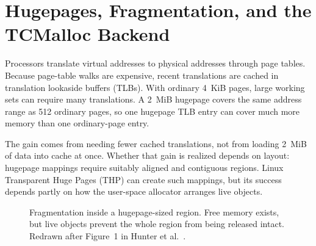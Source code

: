 \documentclass[sigconf]{acmart}
\begin{document}
\section{Hugepages, Fragmentation, and the TCMalloc Backend}
\label{sec:background-temeraire}

Processors translate virtual addresses to physical addresses through page
tables. Because page-table walks are expensive, recent translations are cached
in translation lookaside buffers (TLBs). With ordinary 4~KiB pages, large
working sets can require many translations. A 2~MiB hugepage covers the same
address range as 512 ordinary pages, so one hugepage TLB entry can cover much
more memory than one ordinary-page entry.

The gain comes from needing fewer cached translations, not from loading 2~MiB of
data into cache at once. Whether that gain is realized depends on layout:
hugepage mappings require suitably aligned and contiguous regions. Linux
Transparent Huge Pages (THP) can create such mappings, but its success depends
partly on how the user-space allocator arranges live objects.

\begin{figure}[t]
\centering
{}
\caption{Fragmentation inside a hugepage-sized region. Free memory exists,
but live objects prevent the whole region from being released intact. Redrawn
after Figure~1 in Hunter et al.~\cite{273711}.}
\label{fig:fragmentation}
\end{figure}
\end{document}
